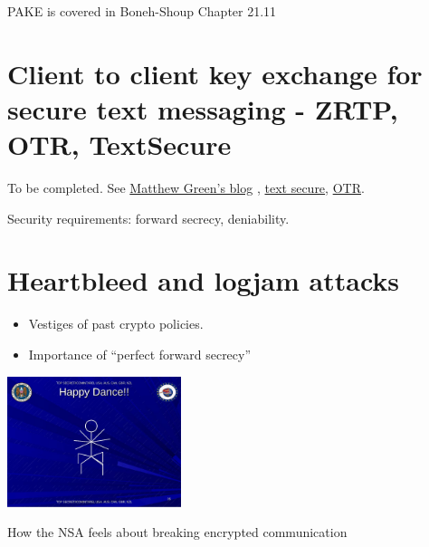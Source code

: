 PAKE is covered in Boneh-Shoup Chapter 21.11

\section{Client to client key exchange for secure text messaging - ZRTP,
OTR, TextSecure}\label{12-Client-to-client-key-e}

To be completed. See
\href{http://blog.cryptographyengineering.com/2013/03/here-come-encryption-apps.html}{Matthew
Green's blog} ,
\href{https://whispersystems.org/blog/advanced-ratcheting/}{text
secure}, \href{https://otr.cypherpunks.ca/Protocol-v3-4.0.0.html}{OTR}.

Security requirements: forward secrecy, deniability.

\section{Heartbleed and logjam attacks}\label{12-Heartbleed-and-logjam-}

\begin{itemize}
\item
  Vestiges of past crypto policies.
\item
  Importance of ``perfect forward secrecy''
\end{itemize}

\begin{marginfigure}
\centering
\includegraphics[width=\linewidth, height=1.5in, keepaspectratio]{../figure/NSA_Page_29.jpg}
\caption{How the NSA feels about breaking encrypted communication}
\label{tmplabelfig}
\end{marginfigure}
